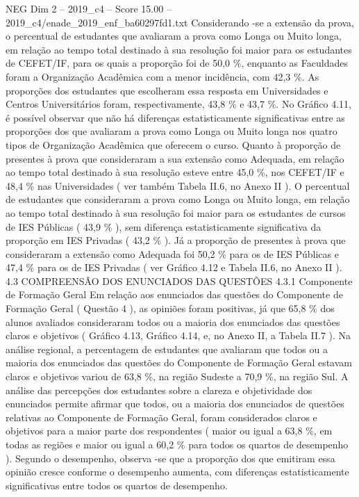 \begin{textsample}{NEG Dim 2 – 2019\_c4 – Score 15.00 – 2019\_c4/enade\_2019\_enf\_ba60297fd1.txt}
Considerando -se a extensão da prova, o percentual de estudantes que avaliaram a prova como Longa ou Muito longa, em relação ao tempo total destinado à sua resolução foi maior para os estudantes de CEFET/IF, para os quais a proporção foi de 50,0 \%, enquanto as Faculdades foram a Organização Acadêmica com a menor incidência, com 42,3 \%.
As proporções dos estudantes que escolheram essa resposta em Universidades e Centros Universitários foram, respectivamente, 43,8 \% e 43,7 \%.
No Gráfico 4.11, é possível observar que não há diferenças estatisticamente significativas entre as proporções dos que avaliaram a prova como Longa ou Muito longa nos quatro tipos de Organização Acadêmica que oferecem o curso.
Quanto à proporção de presentes à prova que consideraram a sua extensão como Adequada, em relação ao tempo total destinado à sua resolução esteve entre 45,0 \%, nos CEFET/IF e 48,4 \% nas Universidades ( ver também Tabela II.6, no Anexo II ).
O percentual de estudantes que consideraram a prova como Longa ou Muito longa, em relação ao tempo total destinado à sua resolução foi maior para os estudantes de cursos de IES Públicas ( 43,9 \% ), sem diferença estatisticamente significativa da proporção em IES Privadas ( 43,2 \% ).
Já a proporção de presentes à prova que consideraram a extensão como Adequada foi 50,2 \% para os de IES Públicas e 47,4 \% para os de IES Privadas ( ver Gráfico 4.12 e Tabela II.6, no Anexo II ). 4.3 COMPREENSÃO DOS ENUNCIADOS DAS QUESTÕES 4.3.1 Componente de Formação Geral Em relação aos enunciados das questões do Componente de Formação Geral ( Questão 4 ), as opiniões foram positivas, já que 65,8 \% dos alunos avaliados consideraram todos ou a maioria dos enunciados das questões claros e objetivos ( Gráfico 4.13, Gráfico 4.14, e, no Anexo II, a Tabela II.7 ).
Na análise regional, a percentagem de estudantes que avaliaram que todos ou a maioria dos enunciados das questões do Componente de Formação Geral estavam claros e objetivos variou de 63,8 \%, na região Sudeste a 70,9 \%, na região Sul.
A análise das percepções dos estudantes sobre a clareza e objetividade dos enunciados permite afirmar que todos, ou a maioria dos enunciados de questões relativas ao Componente de Formação Geral, foram considerados claros e objetivos para a maior parte dos respondentes ( maior ou igual a 63,8 \%, em todas as regiões e maior ou igual a 60,2 \% para todos os quartos de desempenho ).
Segundo o desempenho, observa -se que a proporção dos que emitiram essa opinião cresce conforme o desempenho aumenta, com diferenças estatisticamente significativas entre todos os quartos de desempenho.

\end{textsample}
